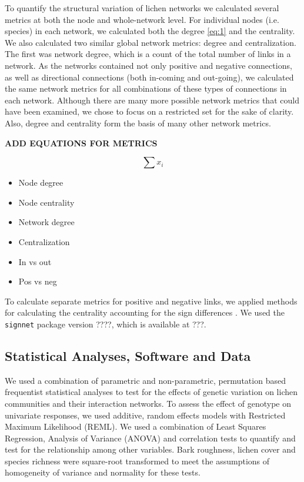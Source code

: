\documentclass[11pt,twocolumn,twoside,lineno]{pnas-new}
\begin{document}
{To quantify the structural variation of lichen networks we calculated
several metrics at both the node and whole-network level. For
individual nodes (i.e. species) in each network, we calculated both
the degree \eqref{eq:1} and the centrality. We also calculated two
similar global network metrics: degree and centralization. The first
was network degree, which is a count of the total number of links in a
network. As the networks contained not only positive and negative
connections, as well as directional connections (both in-coming and
out-going), we calculated the same network metrics for all
combinations of these types of connections in each network. Although
there are many more possible network metrics that could have been
examined, we chose to focus on a restricted set for the sake of
clarity. Also, degree and centrality form the basis of many other
network metrics. 

\textbf{ADD EQUATIONS FOR METRICS}

\begin{equation}
  \sum{x_i}\label{eq:1}
\end{equation}

\begin{itemize}
\item Node degree
\item Node centrality
\item Network degree
\item Centralization 
\item In vs out 
\item Pos vs neg 
\end{itemize}

To calculate separate metrics for positive and negative links, we
applied methods for calculating the centrality accounting for the
sign differences \cite{Everett2014NetworksTies}. We used the \texttt{signnet}
package version ????, which is available at ???.


\subsection*{Statistical Analyses, Software and Data}

We used a combination of parametric and non-parametric, permutation
based frequentist statistical analyses to test for the effects of
genetic variation on lichen communities and their interaction
networks. To assess the effect of genotype on univariate responses, we
used additive, random effects models with Restricted Maximum
Likelihood (REML). We used a combination of Least Squares Regression,
Analysis of Variance (ANOVA) and correlation tests to quantify and
test for the relationship among other variables. Bark roughness,
lichen cover and species richness were square-root transformed to meet
the assumptions of homogeneity of variance and normality for these
tests.

}
\end{document}
